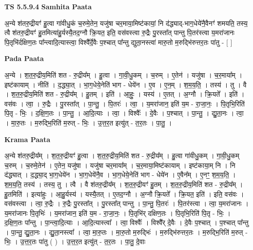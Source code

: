 \documentclass[17pt]{extarticle}
\begin{document}
\textbf{TS 5.5.9.4 } \newline
\textbf{Samhita Paata} \newline

अ॒न्ये श॑तरु॒द्रीयꣳ॑ हु॒त्वा गा॑वीधु॒कं च॒रुमे॒तेन॒ यजु॑षा चर॒माया॒मिष्ट॑कायां॒ नि द॑द्ध्याद्-भाग॒धेये॑नै॒वैनꣳ॑ शमयति॒ तस्य॒ त्वै श॑तरु॒द्रीयꣳ॑ हु॒तमित्या॑हु॒र्यस्यै॒तद॒ग्नौ क्रि॒यत॒ इति॒ वस॑वस्त्वा रु॒द्रैः पु॒रस्ता᳚त् पान्तु पि॒तर॑स्त्वा य॒मरा॑जानः पि॒तृभि॑र्दक्षिण॒तः पा᳚न्त्वादि॒त्यास्त्वा॒ विश्वै᳚र्दे॒वैः प॒श्चात् पा᳚न्तु द्युता॒नस्त्वा॑ मारु॒तो म॒रुद्भि॑रुत्तर॒तः पा॑तु - [  ] \newline

\textbf{Pada Paata} \newline

अ॒न्ये । श॒त॒रु॒द्रीय॒मिति॑ शत - रु॒द्रीय᳚म् । हु॒त्वा । गा॒वी॒धु॒कम् । च॒रुम् । ए॒तेन॑ । यजु॑षा । च॒र॒माया᳚म् । इष्ट॑कायाम् । नीति॑ । द॒द्ध्या॒त् । भा॒ग॒धेये॒नेति॑ भाग - धेये॑न । ए॒व । ए॒न॒म् । श॒म॒य॒ति॒ । तस्य॑ । तु । वै । श॒त॒रु॒द्रीय॒मिति॑ शत - रु॒द्रीय᳚म् । हु॒तम् । इति॑ । आ॒हुः॒ । यस्य॑ । ए॒तत् । अ॒ग्नौ । क्रि॒यते᳚ । इति॑ । वस॑वः । त्वा॒ । रु॒द्रैः । पु॒रस्ता᳚त् । पा॒न्तु॒ । पि॒तरः॑ । त्वा॒ । य॒मरा॑जान॒ इति॑ य॒म - रा॒जा॒नः॒ । पि॒तृभि॒रिति॑ पि॒तृ - भिः॒ । द॒क्षि॒ण॒तः । पा॒न्तु॒ । आ॒दि॒त्याः । त्वा॒ । विश्वैः᳚ । दे॒वैः । प॒श्चात् । पा॒न्तु॒ । द्यु॒ता॒नः । त्वा॒ । मा॒रु॒तः । म॒रुद्भि॒रिति॑ म॒रुत् - भिः॒ । उ॒त्त॒र॒त इत्यु॑त् - त॒र॒तः । पा॒तु॒ ।  \newline


\textbf{Krama Paata} \newline

अ॒न्ये श॑तरु॒द्रीय᳚म् । श॒त॒रु॒द्रीयꣳ॑ हु॒त्वा । श॒त॒रु॒द्रीय॒मिति॑ शत - रु॒द्रीय᳚म् । हु॒त्वा गा॑वीधु॒कम् । गा॒वी॒धु॒कम् च॒रुम् । च॒रुमे॒तेन॑ । ए॒तेन॒ यजु॑षा । यजु॑षा चर॒माया᳚म् । च॒र॒माया॒मिष्ट॑कायाम् । इष्ट॑काया॒म् नि । नि द॑द्ध्यात् । द॒द्ध्या॒द् भा॒ग॒धेये॑न । भा॒ग॒धेये॑नै॒व । भा॒ग॒धेये॒नेति॑ भाग - धेये॑न । ए॒वैन᳚म् । ए॒नꣳ॒॒ श॒म॒य॒ति॒ । श॒म॒य॒ति॒ तस्य॑ । तस्य॒ तु । त्वै । वै श॑तरु॒द्रीय᳚म् । श॒त॒रु॒द्रीयꣳ॑ हु॒तम् । श॒त॒रु॒द्रीय॒मिति॑ शत - रु॒द्रीय᳚म् । हु॒तमिति॑ । इत्या॑हुः । आ॒हु॒र्यस्य॑ । यस्यै॒तत् । ए॒तद॒ग्नौ । अ॒ग्नौ क्रि॒यते᳚ । क्रि॒यत॒ इति॑ । इति॒ वस॑वः । वस॑वस्त्वा । त्वा॒ रु॒द्रैः । रु॒द्रैः पु॒रस्ता᳚त् । पु॒रस्ता᳚त् पान्तु । पा॒न्तु॒ पि॒तरः॑ । पि॒तर॑स्त्वा । त्वा॒ य॒मरा॑जानः । य॒मरा॑जानः पि॒तृभिः॑ । य॒मरा॑जान॒ इति॑ य॒म - रा॒जा॒नः॒ । पि॒तृभि॑र् दक्षिण॒तः । पि॒तृभि॒रिति॑ पि॒तृ - भिः॒ । द॒क्षि॒ण॒तः पा᳚न्तु । पा॒न्त्वा॒दि॒त्याः । आ॒दि॒त्यास्त्वा᳚ । त्वा॒ विश्वैः᳚ । विश्वै᳚र् दे॒वैः । दे॒वैः प॒श्चात् । प॒श्चात् पा᳚न्तु । पा॒न्तु॒ द्यु॒ता॒नः । द्यु॒ता॒नस्त्वा᳚ । त्वा॒ मा॒रु॒तः । मा॒रु॒तो म॒रुद्भिः॑ । म॒रुद्भि॑रुत्तर॒तः । म॒रुद्भि॒रिति॑ म॒रुत् - भिः॒ । उ॒त्त॒र॒तः पा॑तु ( ) । उ॒त्त॒र॒त इत्यु॑त् - त॒र॒तः । पा॒तु॒ दे॒वाः \newline
\end{document}
